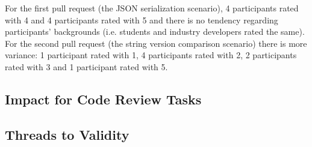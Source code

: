 \documentclass[../manifest.tex]{subfiles}
\begin{document}

For the first pull request (the JSON serialization scenario), 4 participants rated with 4 and 4 participants rated with 5 and there is no tendency regarding participants' backgrounds (i.e. students and industry developers rated the same). For the second pull request (the string version comparison scenario) there is more variance: 1 participant rated with 1, 4 participants rated with 2, 2 participants rated with 3 and 1 participant rated with 5.


\subsection{Impact for Code Review Tasks} \label{eval-impact}

\subsection{Threads to Validity} \label{eval-threats}
\end{document}
